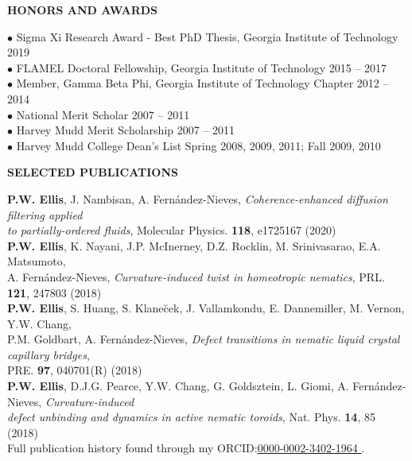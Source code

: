 \documentclass[10pt]{article}
\newenvironment{changemargin}[2]{%
  \list{}{\rightmargin#2\leftmargin#1
    \parsep=0pt\topsep=1pt\partopsep=0pt}
\item[]} {\endlist}
\newenvironment{indentmore}{\begin{changemargin}{10pt}{0cm}}{\end{changemargin}}
\begin{document}
\newpage

\textbf{\large HONORS AND AWARDS}
\begin{indentmore}
\begin{indentmore}
$\bullet$ Sigma Xi Research Award - Best PhD Thesis, Georgia Institute of Technology \hfill 2019\\
$\bullet$ FLAMEL Doctoral Fellowship, Georgia Institute of Technology \hfill 2015 -- 2017\\
$\bullet$ Member, Gamma Beta Phi, Georgia Institute of Technology Chapter \hfill 2012 -- 2014\\
$\bullet$ National Merit Scholar \hfill 2007 -- 2011\\
$\bullet$ Harvey Mudd Merit Scholarship \hfill 2007 -- 2011\\
$\bullet$ Harvey Mudd College Dean's List \hfill Spring 2008, 2009, 2011; Fall 2009, 2010\\
\end{indentmore}
\end{indentmore}

\textbf{\large SELECTED PUBLICATIONS}
\begin{indentmore}
\textbf{P.W. Ellis}, J. Nambisan, A. Fern\'{a}ndez-Nieves, \emph{Coherence-enhanced diffusion filtering applied \\ \hspace*{15pt} to partially-ordered fluids}, Molecular Physics. {\bf 118}, e1725167 (2020)\\

\textbf{P.W. Ellis}, K. Nayani, J.P. McInerney, D.Z. Rocklin, M. Srinivasarao, E.A. Matsumoto, \\ \hspace*{15pt} A. Fern\'{a}ndez-Nieves, \emph{Curvature-induced twist in homeotropic nematics}, PRL. {\bf 121}, 247803 (2018) \\

\textbf{P.W. Ellis}, S. Huang, S. Klane\u{c}ek, J. Vallamkondu, E. Dannemiller, M. Vernon, Y.W. Chang, \\ \hspace*{15pt} P.M. Goldbart, A. Fern\'{a}ndez-Nieves, \emph{Defect transitions in nematic liquid crystal capillary bridges},\\ \hspace*{15pt} PRE. {\bf 97}, 040701(R) (2018)\\

\textbf{P.W. Ellis}, D.J.G. Pearce, Y.W. Chang, G. Goldsztein, L. Giomi, A. Fern\'{a}ndez-Nieves, \emph{Curvature-induced \\ \hspace*{15pt} defect unbinding and dynamics in active nematic toroids}, Nat. Phys. {\bf 14}, 85 (2018)\\

Full publication history found through my ORCID:\href{https://orcid.org/0000-0002-3402-1964}{0000-0002-3402-1964 }.\\
\end{indentmore}
\end{document}
